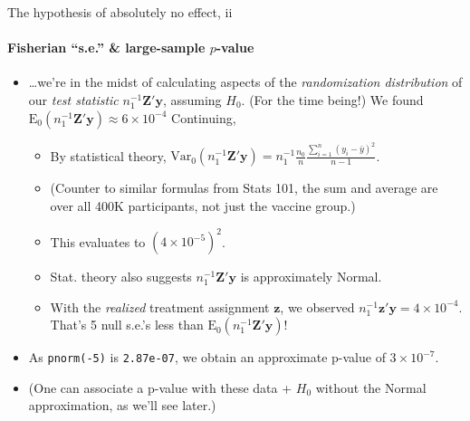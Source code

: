   \begin{frame}{The hypothesis of absolutely no effect,  ii}
\framesubtitle{Fisherian ``s.e.'' \& large-sample $p$-value}

\begin{itemize}
\item \ldots we're in the midst of calculating aspects of the \textit{randomization
  distribution} of our \textit{test statistic}
$n_{1}^{-1}\mathbf{Z}'\mathbf{y}$, assuming $H_{0}$.  (For the
time being!) \pause We found
$\mathrm{E}_{0}(n_{1}^{-1}\mathbf{Z}'\mathbf{y}) \approx 6\times
10^{-4}$  Continuing, 
\begin{itemize}
     \item By statistical theory, 
       $\mathrm{Var}_{0}(n_{1}^{-1}\mathbf{Z}'\mathbf{y}) = n_{1}^{-1}
  \frac{n_{0}}{n} \frac{\sum_{i=1}^{n} (y_{i} - \bar
    y)^{2}}{n-1}$.
  \item (Counter to similar formulas from Stats 101, the sum and
    average are over all 400K participants, not just the vaccine
    group.) 
  \item This evaluates to
  $\left(4\times 10^{-5}\right)^{2}$.
     \item Stat. theory also suggests $n_{1}^{-1}\mathbf{Z}'\mathbf{y}$ is
       approximately Normal.
     \item With the \textit{realized} treatment assignment
       $\mathbf{z}$, we  observed $n_{1}^{-1}\mathbf{z}'\mathbf{y} =4 \times
       10^{-4}$.  That's 5 null s.e.'s less than
       $\mathrm{E}_{0}(n_{1}^{-1}\mathbf{Z}'\mathbf{y})$!
     \end{itemize}
   \item As \texttt{pnorm(-5)} is \texttt{2.87e-07}, we obtain an
     approximate p-value of $3 \times 10^{-7}$.
   \item (One can associate a p-value with these data + $H_{0}$ without the
     Normal approximation, as we'll see later.)
\end{itemize}
\end{frame}

